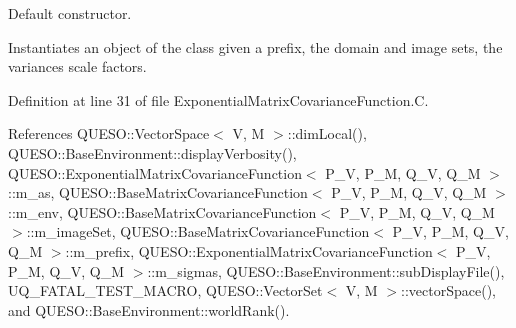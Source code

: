Default constructor. 

Instantiates an object of the class given a prefix, the domain and image sets, the variances scale factors. 

Definition at line 31 of file Exponential\-Matrix\-Covariance\-Function.\-C.



References Q\-U\-E\-S\-O\-::\-Vector\-Space$<$ V, M $>$\-::dim\-Local(), Q\-U\-E\-S\-O\-::\-Base\-Environment\-::display\-Verbosity(), Q\-U\-E\-S\-O\-::\-Exponential\-Matrix\-Covariance\-Function$<$ P\-\_\-\-V, P\-\_\-\-M, Q\-\_\-\-V, Q\-\_\-\-M $>$\-::m\-\_\-as, Q\-U\-E\-S\-O\-::\-Base\-Matrix\-Covariance\-Function$<$ P\-\_\-\-V, P\-\_\-\-M, Q\-\_\-\-V, Q\-\_\-\-M $>$\-::m\-\_\-env, Q\-U\-E\-S\-O\-::\-Base\-Matrix\-Covariance\-Function$<$ P\-\_\-\-V, P\-\_\-\-M, Q\-\_\-\-V, Q\-\_\-\-M $>$\-::m\-\_\-image\-Set, Q\-U\-E\-S\-O\-::\-Base\-Matrix\-Covariance\-Function$<$ P\-\_\-\-V, P\-\_\-\-M, Q\-\_\-\-V, Q\-\_\-\-M $>$\-::m\-\_\-prefix, Q\-U\-E\-S\-O\-::\-Exponential\-Matrix\-Covariance\-Function$<$ P\-\_\-\-V, P\-\_\-\-M, Q\-\_\-\-V, Q\-\_\-\-M $>$\-::m\-\_\-sigmas, Q\-U\-E\-S\-O\-::\-Base\-Environment\-::sub\-Display\-File(), U\-Q\-\_\-\-F\-A\-T\-A\-L\-\_\-\-T\-E\-S\-T\-\_\-\-M\-A\-C\-R\-O, Q\-U\-E\-S\-O\-::\-Vector\-Set$<$ V, M $>$\-::vector\-Space(), and Q\-U\-E\-S\-O\-::\-Base\-Environment\-::world\-Rank().


